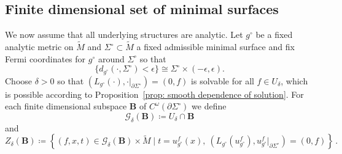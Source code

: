 \documentclass[11pt]{amsart}
\theoremstyle{definition}
\numberwithin{equation}{section}
\newcommand{\G}{\mathcal G}
\newcommand{\p}{\partial}
\newcommand{\BB}{\mathbf B}
\begin{document}
\subsection{Finite dimensional set of minimal surfaces} \label{subsec_finite_dim_ms}

We now assume that all underlying structures are analytic. Let $g^\circ$ be a fixed analytic metric on $\widetilde{M}$ and $\Sigma^\circ\subset \widetilde{M}$ a fixed admissible minimal surface and fix Fermi coordinates for $g^\circ$ around $\Sigma^\circ$ so that
$$\{d_{g^\circ}(\cdot, \Sigma^\circ)<\epsilon\} \cong \Sigma^\circ \times (-\epsilon, \epsilon).$$
Choose $\delta>0$ so that $(L_{g^\circ}(\cdot),\cdot\vert_{\p\Sigma^\circ})=(0,f)$ is solvable for all $f\in U_\delta$, which is possible according to Proposition~\ref{prop: smooth dependence of solution}. For each finite dimensional subspace $\BB$ of $C^\omega(\partial\Sigma^\circ)$ we define
\begin{equation}\label{eq: def of G}
\G_\delta(\BB) \coloneqq U_\delta\cap \BB 
\end{equation}
and 
\begin{equation}\label{eq: def of ZB}
Z_\delta(\BB) \coloneqq \left\{(f, x,t)\in \G_\delta(\BB)\times \widetilde M\mid t = u^f_{g^\circ}(x),\ (L_{g^\circ}(u^f_{g^\circ}),u_{g^\circ}^f\vert_{\partial\Sigma^\circ})=(0,f)\right\}\,.%
\end{equation}
\end{document}
